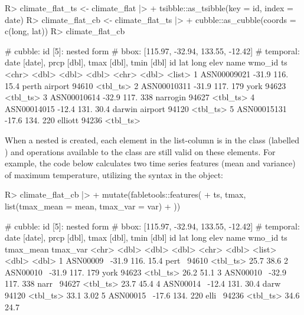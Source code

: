 \documentclass[
  shortnames]{jss}
\begin{document}
\begin{CodeChunk}
\begin{CodeInput}
R> climate_flat_ts <- climate_flat |> 
+   tsibble::as_tsibble(key = id, index = date)
R> climate_flat_cb <-  climate_flat_ts |> 
+   cubble::as_cubble(coords = c(long, lat))
R> climate_flat_cb
\end{CodeInput}
\begin{CodeOutput}
# cubble:   id [5]: nested form
# bbox:     [115.97, -32.94, 133.55, -12.42]
# temporal: date [date], prcp [dbl], tmax [dbl], tmin [dbl]
  id            lat  long  elev name           wmo_id ts      
  <chr>       <dbl> <dbl> <dbl> <chr>           <dbl> <list>  
1 ASN00009021 -31.9  116.  15.4 perth airport   94610 <tbl_ts>
2 ASN00010311 -31.9  117. 179   york            94623 <tbl_ts>
3 ASN00010614 -32.9  117. 338   narrogin        94627 <tbl_ts>
4 ASN00014015 -12.4  131.  30.4 darwin airport  94120 <tbl_ts>
5 ASN00015131 -17.6  134. 220   elliott         94236 <tbl_ts>
\end{CodeOutput}
\end{CodeChunk}

When a nested  is created, each element in the list-column  is in the  class (labelled ) and operations available to the  class are still valid on these elements. For example, the code below calculates two time series features (mean and variance) of maximum temperature, utilizing the  syntax in the  object:

\begin{CodeChunk}
\begin{CodeInput}
R> climate_flat_cb |> 
+   mutate(fabletools::features(
+     ts, tmax, list(tmax_mean = mean, tmax_var = var)
+     ))
\end{CodeInput}
\begin{CodeOutput}
# cubble:   id [5]: nested form
# bbox:     [115.97, -32.94, 133.55, -12.42]
# temporal: date [date], prcp [dbl], tmax [dbl], tmin [dbl]
  id          lat  long  elev name  wmo_id ts       tmax_mean tmax_var
  <chr>     <dbl> <dbl> <dbl> <chr>  <dbl> <list>       <dbl>    <dbl>
1 ASN00009~ -31.9  116.  15.4 pert~  94610 <tbl_ts>      25.7    38.6 
2 ASN00010~ -31.9  117. 179   york   94623 <tbl_ts>      26.2    51.1 
3 ASN00010~ -32.9  117. 338   narr~  94627 <tbl_ts>      23.7    45.4 
4 ASN00014~ -12.4  131.  30.4 darw~  94120 <tbl_ts>      33.1     3.02
5 ASN00015~ -17.6  134. 220   elli~  94236 <tbl_ts>      34.6    24.7 
\end{CodeOutput}
\end{CodeChunk}
\end{document}
